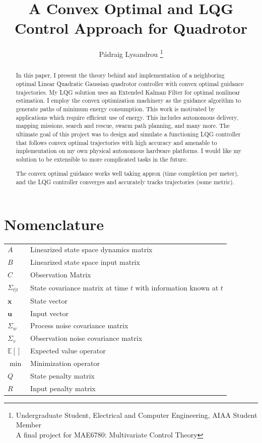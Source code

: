 \documentclass[conf]{new-aiaa}
\title{A Convex Optimal and LQG Control Approach for Quadrotor}
\author{Pádraig Lysandrou
\footnote{Undergraduate Student, Electrical and Computer Engineering, AIAA Student Member \\ A final project for MAE6780: Multivariate Control Theory}}
\affil{Cornell University, Ithaca, New York, 14853}
\begin{document}
\maketitle

\begin{abstract}
In this paper, I present the theory behind and implementation of a neighboring optimal Linear Quadratic Gaussian quadrotor controller with convex optimal guidance trajectories. My LQG solution uses an Extended Kalman Filter for optimal nonlinear estimation. I employ the convex optimization machinery as the guidance algorithm to generate paths of minimum energy consumption. This work is motivated by applications which require efficient use of energy. This includes autonomous delivery, mapping missions, search and rescue, swarm path planning, and many more. The ultimate goal of this project was to design and simulate a functioning LQG controller that follows convex optimal trajectories with high accuracy and amenable to implementation on my own physical autonomous hardware platforms. I would like my solution to be extensible to more complicated tasks in the future.

 The convex optimal guidance works well taking approx (time completion per meter), and the LQG controller converges and accurately tracks trajectories (some metric).
\end{abstract}

\section*{Nomenclature}

{\renewcommand\arraystretch{1.0}
\noindent\begin{longtable*}{@{}l @{\quad=\quad} l@{}}
$A$ & Linearized state space dynamics matrix\\
$B$ & Linearized state space input matrix\\
$C$ & Observation Matrix \\
$\Sigma_{t|t}$ & State covariance matrix at time $t$ with information known at $t$\\
$\mathbf{x}$ & State vector\\
$\mathbf{u}$ & Input vector\\
$\Sigma_w$ &Process noise covariance matrix\\
$\Sigma_v$ & Observation noise covariance matrix \\
$\mathbb{E}[]$ &Expected value operator \\
$\min$ &Minimization operator \\
$Q$ &State penalty matrix \\
$R$ &Input penalty matrix \\
\end{longtable*}}
\end{document}
